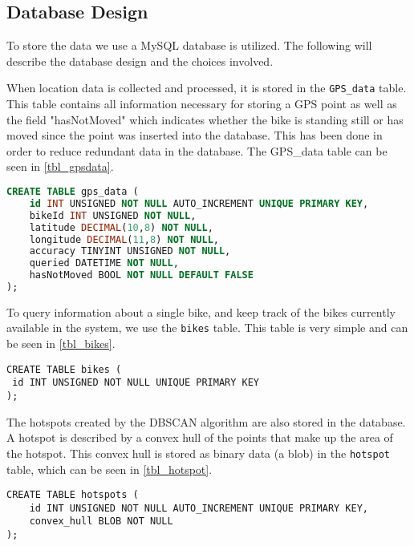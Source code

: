 \subsection{Database Design}\label{database_design}
To store the data we use a MySQL database is utilized.
The following will describe the database design and the choices involved.

When location data is collected and processed, it is stored in the \texttt{GPS\_data} table.
This table contains all information necessary for storing a GPS point as well as the field "hasNotMoved" which indicates whether the bike is standing still or has moved since the point was inserted into the database.
This has been done in order to reduce redundant data in the database.
The GPS\_data table can be seen in \cref{tbl_gpsdata}.

\begin{lstlisting}[caption=Table for GPS\_data, label=tbl_gpsdata, language=SQL]
CREATE TABLE gps_data (
	id INT UNSIGNED NOT NULL AUTO_INCREMENT UNIQUE PRIMARY KEY,
	bikeId INT UNSIGNED NOT NULL,
	latitude DECIMAL(10,8) NOT NULL,
	longitude DECIMAL(11,8) NOT NULL,
	accuracy TINYINT UNSIGNED NOT NULL,
	queried DATETIME NOT NULL,
	hasNotMoved BOOL NOT NULL DEFAULT FALSE
);
\end{lstlisting}

To query information about a single bike, and keep track of the bikes currently available in the system, we use the \texttt{bikes} table.
This table is very simple and can be seen in \cref{tbl_bikes}.

\begin{lstlisting}[caption=Table for bikes, label=tbl_bikes]
CREATE TABLE bikes (
 id INT UNSIGNED NOT NULL UNIQUE PRIMARY KEY
);
\end{lstlisting}

The hotspots created by the DBSCAN algorithm are also stored in the database.
A hotspot is described by a convex hull of the points that make up the area of the hotspot.
This convex hull is stored as binary data (a blob) in the \texttt{hotspot} table, which can be seen in \cref{tbl_hotspot}.

\begin{lstlisting}[caption=Table for hotspots, label=tbl_hotspot]
CREATE TABLE hotspots (
	id INT UNSIGNED NOT NULL AUTO_INCREMENT UNIQUE PRIMARY KEY,
	convex_hull BLOB NOT NULL
);
\end{lstlisting}